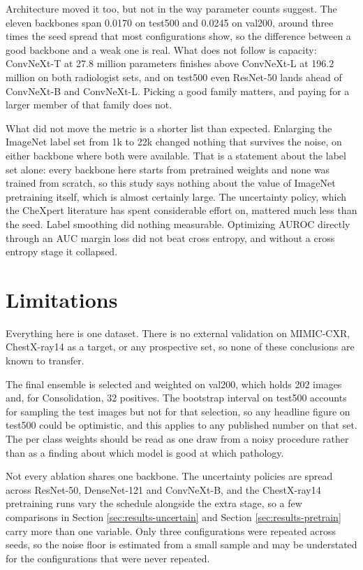 \documentclass{article}
\begin{document}
Architecture moved it too, but not in the way parameter counts suggest. The eleven
backbones span 0.0170 on test500 and 0.0245 on val200, around three times the seed
spread that most configurations show, so the difference between a good backbone and a
weak one is real. What does not follow is capacity: ConvNeXt-T at 27.8 million parameters finishes above
ConvNeXt-L at 196.2 million on both radiologist sets, and on test500 even ResNet-50
lands ahead of ConvNeXt-B and ConvNeXt-L. Picking a good family matters, and paying for
a larger member of that family does not.

What did not move the metric is a shorter list than expected. Enlarging the ImageNet
label set from 1k to 22k changed nothing that survives the noise, on either    backbone
where both were available. That is a statement about the label set alone: every
backbone here starts from pretrained weights and none was trained from scratch, so this
study says nothing about the value of ImageNet pretraining itself, which is almost
certainly large. The uncertainty policy, which the CheXpert literature has spent
considerable effort on, mattered much less than the seed. Label smoothing did nothing
measurable. Optimizing AUROC directly through an AUC margin loss did not beat cross
entropy, and without a cross entropy stage it collapsed.

\section{Limitations}

Everything here is one dataset. There is no external validation on MIMIC-CXR,
ChestX-ray14 as a target, or any prospective set, so none of these conclusions are known
to transfer.

The final ensemble is selected and weighted on val200, which holds 202 images and, for
Consolidation, 32 positives. The bootstrap interval on test500 accounts for sampling the
test images but not for that selection, so any headline figure on test500 could be
optimistic, and this applies to any published number on that set. The per class weights should be read as one draw from a noisy
procedure rather than as a finding about which model is good at which pathology.

Not every ablation shares one backbone. The uncertainty policies are spread across
ResNet-50, DenseNet-121 and ConvNeXt-B, and the ChestX-ray14 pretraining runs vary the
schedule alongside the extra stage, so a few comparisons in Section
\ref{sec:results-uncertain} and Section \ref{sec:results-pretrain} carry more than one
variable. Only three configurations were repeated across seeds, so the noise floor is
estimated from a small sample and may be understated for the configurations that were
never repeated.
\end{document}
